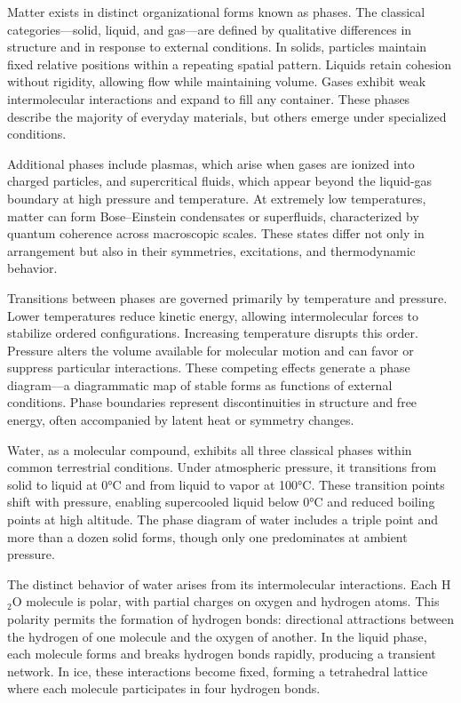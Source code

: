 Matter exists in distinct organizational forms known as phases. The classical categories—solid, liquid, and gas—are defined by qualitative differences in structure and in response to external conditions. In solids, particles maintain fixed relative positions within a repeating spatial pattern. Liquids retain cohesion without rigidity, allowing flow while maintaining volume. Gases exhibit weak intermolecular interactions and expand to fill any container. These phases describe the majority of everyday materials, but others emerge under specialized conditions.

Additional phases include plasmas, which arise when gases are ionized into charged particles, and supercritical fluids, which appear beyond the liquid-gas boundary at high pressure and temperature. At extremely low temperatures, matter can form Bose–Einstein condensates or superfluids, characterized by quantum coherence across macroscopic scales. These states differ not only in arrangement but also in their symmetries, excitations, and thermodynamic behavior.

Transitions between phases are governed primarily by temperature and pressure. Lower temperatures reduce kinetic energy, allowing intermolecular forces to stabilize ordered configurations. Increasing temperature disrupts this order. Pressure alters the volume available for molecular motion and can favor or suppress particular interactions. These competing effects generate a phase diagram—a diagrammatic map of stable forms as functions of external conditions. Phase boundaries represent discontinuities in structure and free energy, often accompanied by latent heat or symmetry changes.

Water, as a molecular compound, exhibits all three classical phases within common terrestrial conditions. Under atmospheric pressure, it transitions from solid to liquid at 0°C and from liquid to vapor at 100°C. These transition points shift with pressure, enabling supercooled liquid below 0°C and reduced boiling points at high altitude. The phase diagram of water includes a triple point and more than a dozen solid forms, though only one predominates at ambient pressure.

The distinct behavior of water arises from its intermolecular interactions. Each H\(_2\)O molecule is polar, with partial charges on oxygen and hydrogen atoms. This polarity permits the formation of hydrogen bonds: directional attractions between the hydrogen of one molecule and the oxygen of another. In the liquid phase, each molecule forms and breaks hydrogen bonds rapidly, producing a transient network. In ice, these interactions become fixed, forming a tetrahedral lattice where each molecule participates in four hydrogen bonds.

